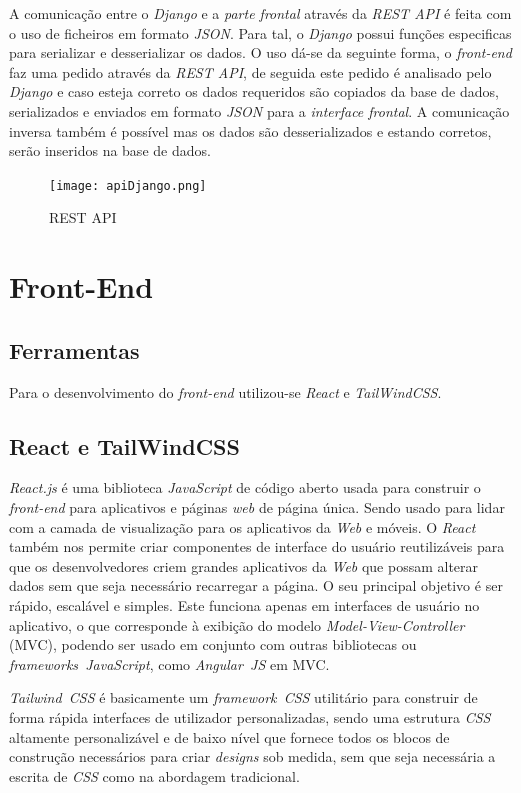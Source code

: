 \documentclass[11pt,a4paper]{report}
\begin{document}
A comunicação entre o \emph{Django} e a \emph{parte frontal} através da \emph{REST API} é feita com o uso de ficheiros em formato \emph{JSON}. Para tal, o \emph{Django} possui funções especificas para serializar e desserializar os dados. O uso dá-se da seguinte forma, o \emph{front-end} faz uma pedido através da \emph{REST API}, de seguida este pedido é analisado pelo \emph{Django} e caso esteja correto os dados requeridos são copiados da base de dados, serializados e enviados em formato \emph{JSON} para a \emph{interface frontal}. A comunicação inversa também é possível mas os dados são desserializados e estando corretos, serão inseridos na base de dados.

\begin{figure}[h]
\centering
\texttt{[image: apiDjango.png]}
\caption{REST API}
\label{fig:pagIni}
\end{figure}

\chapter{Front-End}

\section{Ferramentas}
Para o desenvolvimento do  \emph{front-end} utilizou-se \emph{React} e \emph{TailWindCSS}.

\section{React e TailWindCSS}

\emph{React.js} é uma biblioteca \emph{JavaScript} de código aberto usada para construir o \emph{front-end} para aplicativos e páginas \emph{web} de página única. Sendo usado para lidar com a camada de visualização para os aplicativos da \emph{Web} e móveis. O \emph{React} também nos permite criar componentes de interface do usuário reutilizáveis para que os desenvolvedores criem grandes aplicativos da \emph{Web} que possam alterar dados sem que seja necessário recarregar a página. O seu principal objetivo é ser rápido, escalável e simples. Este funciona apenas em interfaces de usuário no aplicativo, o que corresponde à exibição do modelo \emph{Model-View-Controller} (MVC), podendo ser usado em conjunto com outras bibliotecas ou \emph{frameworks\ JavaScript}, como \emph{Angular\ JS} em MVC.

\emph{Tailwind\ CSS} é basicamente um \emph{framework\ CSS} utilitário para construir de forma rápida interfaces de utilizador personalizadas, sendo uma estrutura \emph{CSS} altamente personalizável e de baixo nível que fornece todos os blocos de construção necessários para criar \emph{designs} sob medida, sem que seja necessária a escrita de \emph{CSS} como na abordagem tradicional.
\end{document}
